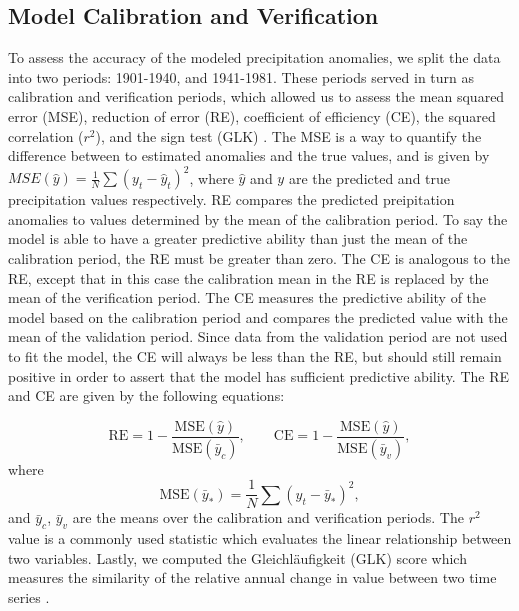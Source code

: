 \documentclass[11pt]{article}
\begin{document}
\subsection{Model Calibration and Verification}

To assess the accuracy of the modeled precipitation anomalies, we split the data into two periods: 1901-1940, and 1941-1981. These periods served in turn as calibration and verification periods, which allowed us to assess the mean squared error (MSE), reduction of error (RE), coefficient of efficiency (CE), the squared correlation ($r^2$), and the sign test (GLK) \cite{national2006surface, fritts1976tree}. The MSE is a way to quantify the difference between to estimated anomalies and the true values, and is given by $MSE(\hat{y}) = \frac{1}{N}\sum (y_t - \hat{y}_t)^2$, where $\hat{y}$ and $y$ are the predicted and true precipitation values respectively. RE compares the predicted preipitation anomalies to values determined by the mean of the calibration period. To say the model is able to have a greater predictive ability than just the mean of the calibration period, the RE must be greater than zero. The CE is analogous to the RE, except that in this case the calibration mean in the RE is replaced by the mean of the verification period. The CE measures the predictive ability of the model based on the calibration period and compares the predicted value with the mean of the validation period. Since data from the validation period are not used to fit the model, the CE will always be less than the RE, but should still remain positive in order to assert that the model has sufficient predictive ability. The RE and CE are given by the following equations:

\begin{equation}
\text{RE} = 1 - \frac{\text{MSE}(\hat{y})}{\text{MSE}(\bar{y}_c)}, \qquad
\text{CE} = 1 - \frac{\text{MSE}(\hat{y})}{\text{MSE}(\bar{y}_v)},
\end{equation} 
where
\begin{equation}
\text{MSE}(\bar{y}_*) = \frac{1}{N}\sum (y_t - \bar{y}_*)^2,
\end{equation} 
and $\bar{y}_c$, $\bar{y}_v$ are the means over the calibration and verification periods. The $r^2$ value is a commonly used statistic which evaluates the linear relationship between two variables. Lastly, we computed the Gleichl\"{a}ufigkeit (GLK) score which measures the similarity of the relative annual change in value between two time series \cite{speer2010fundamentals}. 
\end{document}
